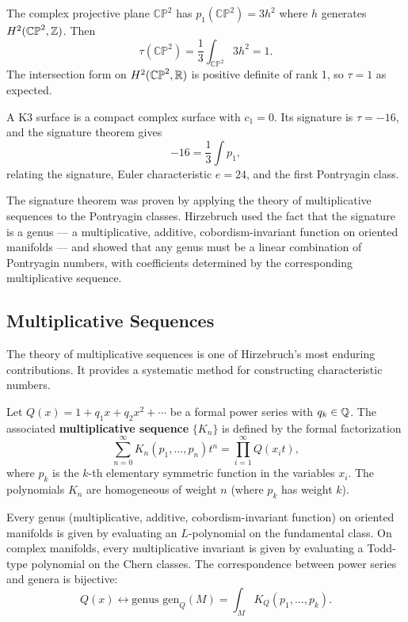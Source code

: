 \begin{example}
The complex projective plane \(\mathbb{CP}^2\) has
\(p_1(\mathbb{CP}^2) = 3h^2\) where \(h\) generates
\(H^2(\mathbb{CP}^2, \mathbb{Z})\). Then
\[
\tau(\mathbb{CP}^2) = \frac13 \int_{\mathbb{CP}^2} 3h^2 = 1.
\]
The intersection form on \(H^2(\mathbb{CP}^2, \mathbb{R})\) is positive definite
of rank 1, so \(\tau = 1\) as expected.
\end{example}

\begin{example}
A K3 surface is a compact complex surface with \(c_1 = 0\). Its
signature is \(\tau = -16\), and the signature theorem gives
\[
-16 = \frac13 \int p_1,
\]
relating the signature, Euler characteristic \(e = 24\), and the first
Pontryagin class.
\end{example}

The signature theorem was proven by applying the theory of
multiplicative sequences to the Pontryagin classes. Hirzebruch used the
fact that the signature is a genus --- a multiplicative, additive,
cobordism-invariant function on oriented manifolds --- and showed that
any genus must be a linear combination of Pontryagin numbers, with
coefficients determined by the corresponding multiplicative sequence.

\subsection{Multiplicative Sequences}

The theory of multiplicative sequences is one of Hirzebruch's most
enduring contributions. It provides a systematic method for
constructing characteristic numbers.

\begin{definition}
Let \(Q(x) = 1 + q_1 x + q_2 x^2 + \cdots\) be a formal power series
with \(q_k \in \mathbb{Q}\). The associated \textbf{multiplicative sequence}
\(\{K_n\}\) is defined by the formal factorization
\[
\sum_{n=0}^\infty K_n(p_1, \dots, p_n) t^n
= \prod_{i=1}^\infty Q(x_i t),
\]
where \(p_k\) is the \(k\)-th elementary symmetric function in the
variables \(x_i\). The polynomials \(K_n\) are homogeneous of weight
\(n\) (where \(p_k\) has weight \(k\)).
\end{definition}

\begin{theorem}[Hirzebruch, 1956]
Every genus (multiplicative, additive, cobordism-invariant function) on
oriented manifolds is given by evaluating an \(L\)-polynomial on the
fundamental class. On complex manifolds, every multiplicative invariant
is given by evaluating a Todd-type polynomial on the Chern classes. The
correspondence between power series and genera is bijective:
\[
Q(x) \longleftrightarrow \text{genus } \text{gen}_Q(M)
= \int_M K_Q(p_1, \dots, p_k).
\]
\end{theorem}

